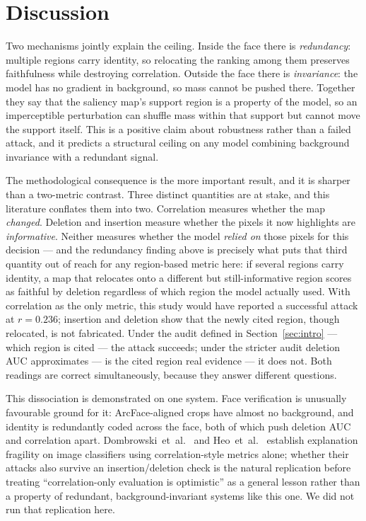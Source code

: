 \documentclass[conference,10pt]{IEEEtran}
\begin{document}
\section{Discussion}
\label{sec:discussion}

Two mechanisms jointly explain the ceiling. Inside the face there is \emph{redundancy}:
multiple regions carry identity, so relocating the ranking among them preserves faithfulness
while destroying correlation. Outside the face there is \emph{invariance}: the model has no
gradient in background, so mass cannot be pushed there. Together they say that the saliency
map's support region is a property of the model, so an imperceptible perturbation can shuffle
mass within that support but cannot move the support itself. This is a positive claim about
robustness rather than a failed attack, and it predicts a structural ceiling on any model
combining background invariance with a redundant signal.

The methodological consequence is the more important result, and it is sharper than a
two-metric contrast. Three distinct quantities are at stake, and this literature conflates them
into two. Correlation measures whether the map \emph{changed}. Deletion and insertion measure
whether the pixels it now highlights are \emph{informative}. Neither measures whether the model
\emph{relied on} those pixels for this decision — and the redundancy finding above is precisely
what puts that third quantity out of reach for any region-based metric here: if several regions
carry identity, a map that relocates onto a different but still-informative region scores as
faithful by deletion regardless of which region the model actually used. With correlation as
the only metric, this study would have reported a successful attack at $r = 0.236$; insertion
and deletion show that the newly cited region, though relocated, is not fabricated. Under the
audit defined in Section~\ref{sec:intro} — which region is cited — the attack succeeds; under
the stricter audit deletion AUC approximates — is the cited region real evidence — it does not.
Both readings are correct simultaneously, because they answer different questions.

This dissociation is demonstrated on one system. Face verification is unusually favourable
ground for it: ArcFace-aligned crops have almost no background, and identity is redundantly
coded across the face, both of which push deletion AUC and correlation apart.
Dombrowski~et~al.~\cite{dombrowski2019explanations} and Heo~et~al.~\cite{heo2019fooling}
establish explanation fragility on image classifiers using correlation-style metrics alone;
whether their attacks also survive an insertion/deletion check is the natural replication
before treating ``correlation-only evaluation is optimistic'' as a general lesson rather than a
property of redundant, background-invariant systems like this one. We did not run that
replication here.
\end{document}
